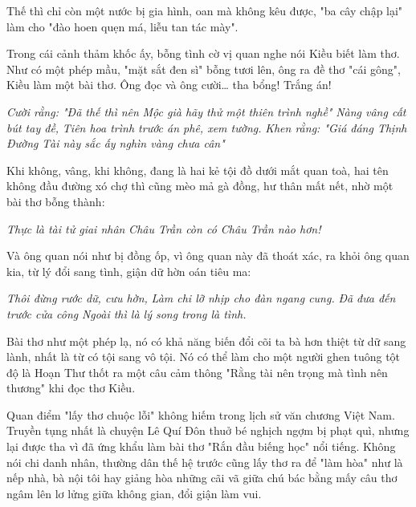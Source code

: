 \documentclass[../main.tex]{subfiles}
\begin{document}
\begin{multicols}{2}
\begin{blockquote}
\end{blockquote}
 
Thế thì chỉ còn một nước bị gia hình, oan mà không kêu được, "ba cây chập lại" làm cho "đào hoen quẹn má, liễu tan tác mày". 
 
Trong cái cảnh thảm khốc ấy, bỗng tình cờ vị quan nghe nói Kiều biết làm thơ. Như có một phép mầu, "mặt sắt đen sì" bỗng tươi lên, ông ra đề thơ "cái gông", Kiều làm một bài thơ. Ông đọc và ông cười… tha bổng! Trắng án!    
\begin{blockquote}
        
\textit{Cười rằng: "Đã thế thì nên}        
\textit{Mộc già hãy thử một thiên trình nghề"}        
\textit{Nàng vâng cất bút tay đề,}        
\textit{Tiên hoa trình trước án phê, xem tường.}        
\textit{Khen rằng: "Giá đáng Thịnh Đường} 
\textit{Tài này sắc ấy nghìn vàng chưa cân"} 

\end{blockquote}
 
Khi không, vâng, khi không, đang là hai kẻ tội đồ dưới mắt quan toà, hai tên không đầu đường xó chợ thì cũng mèo mả gà đồng, hư thân mất nết, nhờ một bài thơ bỗng thành: 
\begin{blockquote}
        
\textit{Thực là tài tử giai nhân} 
\textit{Châu Trần còn có Châu Trần nào hơn!} 

\end{blockquote}
 
Và ông quan nói như bị đồng ốp, vì ông quan này đã thoát xác, ra khỏi ông quan kia, từ lý đổi sang tình, giận dữ hờn oán tiêu ma: 
\begin{blockquote}
        
\textit{Thôi đừng rước dữ, cưu hờn,}        
\textit{Làm chi lỡ nhịp cho đàn ngang cung.}        
\textit{Đã đưa đến trước cửa công} 
\textit{Ngoài thì là lý song trong là tình.} 

\end{blockquote}
 
Bài thơ như một phép lạ, nó có khả năng biến đổi cõi ta bà hơn thiệt từ dữ sang lành, nhất là từ có tội sang vô tội. Nó có thể làm cho một người ghen tuông tột độ là Hoạn Thư thốt ra một câu cảm thông "Rằng tài nên trọng mà tình nên thương" khi đọc thơ Kiều. 
 
Quan điểm "lấy thơ chuộc lỗi" không hiếm trong lịch sử văn chương Việt Nam. Truyền tụng nhất là chuyện Lê Quí Đôn thuở bé nghịch ngợm bị phạt quì, nhưng lại được tha vì đã ứng khẩu làm bài thơ "Rắn đầu biếng học" nổi tiếng. Không nói chi danh nhân, thường dân thế hệ trước cũng lấy thơ ra để "làm hòa" như là nếp nhà, bà nội tôi hay giảng hòa những cãi vã giữa chú bác bằng mấy câu thơ ngâm lên lơ lửng giữa không gian, đổi giận làm vui.   
 

\end{multicols}
\end{document}
